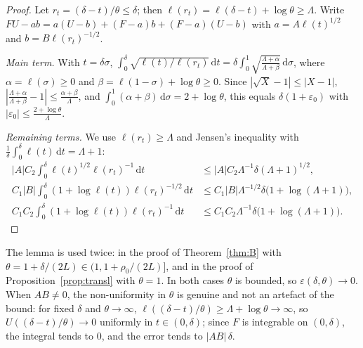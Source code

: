 \documentclass[11pt]{amsart}
\newcommand{\eps}{\varepsilon}
\newcommand{\dd}{\,\mathrm{d}}
\theoremstyle{definition}
\theoremstyle{remark}
\numberwithin{equation}{section}
\begin{document}
\begin{proof}
Let $r_t=(\delta-t)/\theta\le\delta$; then $\ell(r_t)=\ell(\delta-t)+\log\theta\ge\Lambda$. Write $FU-ab=a(U-b)+(F-a)b+(F-a)(U-b)$ with $a=A\ell(t)^{1/2}$ and $b=B\ell(r_t)^{-1/2}$.

\emph{Main term.} With $t=\delta\sigma$, $\int_0^\delta\sqrt{\ell(t)/\ell(r_t)}\dd t=\delta\int_0^1\sqrt{\frac{\Lambda+\alpha}{\Lambda+\beta}}\dd\sigma$, where $\alpha=\ell(\sigma)\ge0$ and $\beta=\ell(1-\sigma)+\log\theta\ge0$. Since $|\sqrt X-1|\le|X-1|$, $|\frac{\Lambda+\alpha}{\Lambda+\beta}-1|\le\frac{\alpha+\beta}\Lambda$, and $\int_0^1(\alpha+\beta)\dd\sigma=2+\log\theta$, this equals $\delta(1+\eps_0)$ with $|\eps_0|\le\frac{2+\log\theta}\Lambda$.

\emph{Remaining terms.} We use $\ell(r_t)\ge\Lambda$ and Jensen's inequality with $\frac1\delta\int_0^\delta\ell(t)\dd t=\Lambda+1$:
\begin{align*}
|A|C_2\int_0^\delta\ell(t)^{1/2}\ell(r_t)^{-1}\dd t&\le|A|C_2\Lambda^{-1}\delta(\Lambda+1)^{1/2},\\
C_1|B|\int_0^\delta(1+\log\ell(t))\ell(r_t)^{-1/2}\dd t&\le C_1|B|\Lambda^{-1/2}\delta\bigl(1+\log(\Lambda+1)\bigr),\\
C_1C_2\int_0^\delta(1+\log\ell(t))\ell(r_t)^{-1}\dd t&\le C_1C_2\Lambda^{-1}\delta\bigl(1+\log(\Lambda+1)\bigr).
\end{align*}
\end{proof}

The lemma is used twice: in the proof of Theorem~\ref{thm:B} with $\theta=1+\delta/(2L)\in(1,1+\rho_0/(2L)]$, and in the proof of Proposition~\ref{prop:transl} with $\theta=1$. In both cases $\theta$ is bounded, so $\eps(\delta,\theta)\to0$. When $AB\ne0$, the non-uniformity in $\theta$ is genuine and not an artefact of the bound: for fixed $\delta$ and $\theta\to\infty$, $\ell((\delta-t)/\theta)\ge\Lambda+\log\theta\to\infty$, so $U((\delta-t)/\theta)\to0$ uniformly in $t\in(0,\delta)$; since $F$ is integrable on $(0,\delta)$, the integral tends to $0$, and the error tends to $|AB|\,\delta$.
\end{document}

